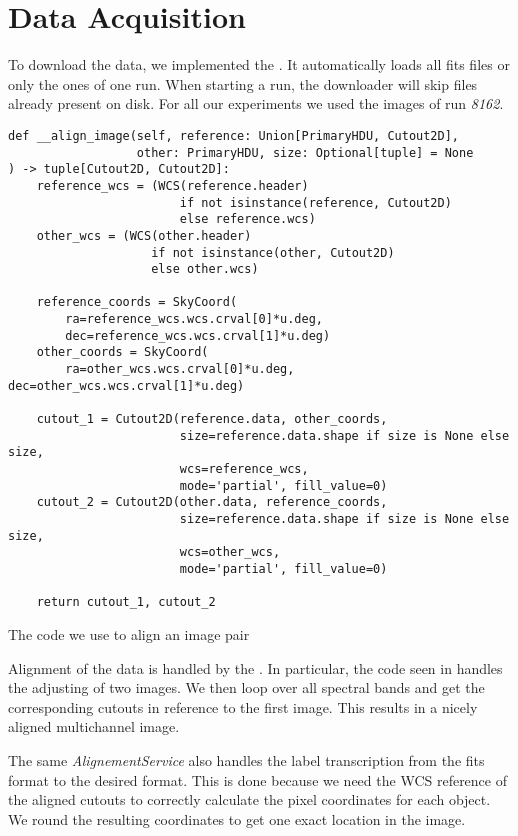\section{Data Acquisition}
To download the data, we implemented the . It automatically loads all fits files or only the ones of one run. When starting a run, the downloader will skip files already present on disk.
For all our experiments we used the images of run \emph{8162}.

\begin{listing}
    \begin{verbatim}
def __align_image(self, reference: Union[PrimaryHDU, Cutout2D],
                  other: PrimaryHDU, size: Optional[tuple] = None
) -> tuple[Cutout2D, Cutout2D]:
    reference_wcs = (WCS(reference.header)
                        if not isinstance(reference, Cutout2D)
                        else reference.wcs)
    other_wcs = (WCS(other.header)
                    if not isinstance(other, Cutout2D)
                    else other.wcs)

    reference_coords = SkyCoord(
        ra=reference_wcs.wcs.crval[0]*u.deg,
        dec=reference_wcs.wcs.crval[1]*u.deg)
    other_coords = SkyCoord(
        ra=other_wcs.wcs.crval[0]*u.deg, dec=other_wcs.wcs.crval[1]*u.deg)

    cutout_1 = Cutout2D(reference.data, other_coords,
                        size=reference.data.shape if size is None else size,
                        wcs=reference_wcs,
                        mode='partial', fill_value=0)
    cutout_2 = Cutout2D(other.data, reference_coords,
                        size=reference.data.shape if size is None else size,
                        wcs=other_wcs,
                        mode='partial', fill_value=0)

    return cutout_1, cutout_2
        \end{verbatim}
    \label{alignementCode}
    \caption{The code we use to align an image pair}
\end{listing}

Alignment of the data is handled by the . In particular, the code seen in  handles the adjusting of two images. We then loop over all spectral bands and get the corresponding cutouts in reference to the first image. This results in a nicely aligned multichannel image.

The same \emph{AlignementService} also handles the label transcription from the fits format to the desired format. This is done because we need the WCS reference of the aligned cutouts to correctly calculate the pixel coordinates for each object.
We round the resulting coordinates to get one exact location in the image.

